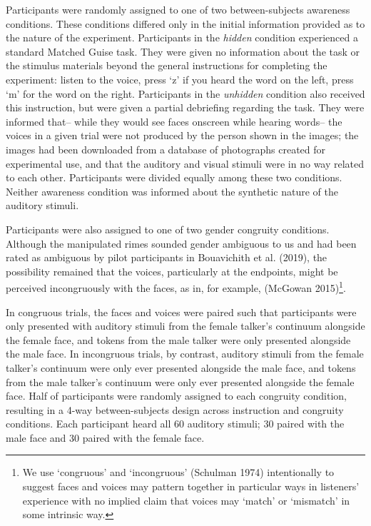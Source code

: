 \documentclass[
  letterpaper,
  DIV=11,
  numbers=noendperiod]{scrartcl}
\begin{document}
Participants were randomly assigned to one of two between-subjects
awareness conditions. These conditions differed only in the initial
information provided as to the nature of the experiment. Participants in
the \emph{hidden} condition experienced a standard Matched Guise task.
They were given no information about the task or the stimulus materials
beyond the general instructions for completing the experiment: listen to
the voice, press `z' if you heard the word on the left, press `m' for
the word on the right. Participants in the \emph{unhidden} condition
also received this instruction, but were given a partial debriefing
regarding the task. They were informed that-- while they would see faces
onscreen while hearing words-- the voices in a given trial were not
produced by the person shown in the images; the images had been
downloaded from a database of photographs created for experimental use,
and that the auditory and visual stimuli were in no way related to each
other. Participants were divided equally among these two conditions.
Neither awareness condition was informed about the synthetic nature of
the auditory stimuli.

Participants were also assigned to one of two gender congruity
conditions. Although the manipulated rimes sounded gender ambiguous to
us and had been rated as ambiguous by pilot participants in Bouavichith
et al. (2019), the possibility remained that the voices, particularly at
the endpoints, might be perceived incongruously with the faces, as in,
for example, (McGowan 2015)\footnote{We use `congruous' and
  `incongruous' (Schulman 1974) intentionally to suggest faces and
  voices may pattern together in particular ways in listeners'
  experience with no implied claim that voices may `match' or `mismatch'
  in some intrinsic way.}.

In congruous trials, the faces and voices were paired such that
participants were only presented with auditory stimuli from the female
talker's continuum alongside the female face, and tokens from the male
talker were only presented alongside the male face. In incongruous
trials, by contrast, auditory stimuli from the female talker's continuum
were only ever presented alongside the male face, and tokens from the
male talker's continuum were only ever presented alongside the female
face. Half of participants were randomly assigned to each congruity
condition, resulting in a 4-way between-subjects design across
instruction and congruity conditions. Each participant heard all 60
auditory stimuli; 30 paired with the male face and 30 paired with the
female face.
\end{document}
